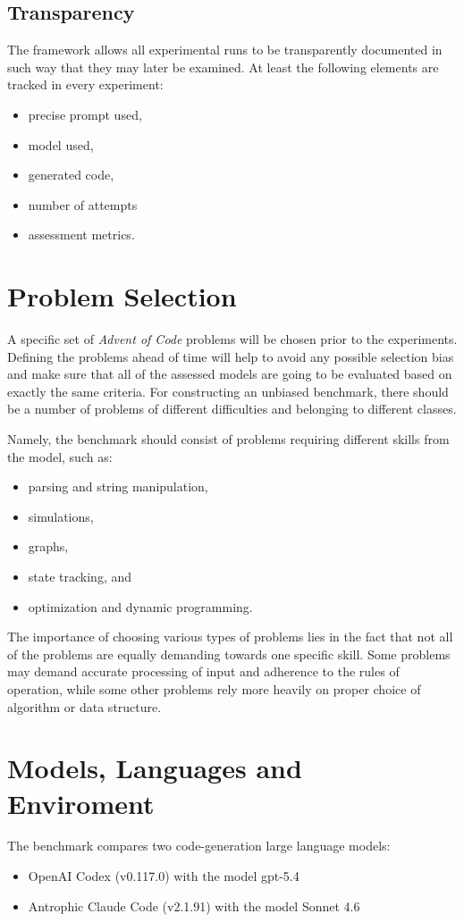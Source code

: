 \documentclass[12pt,a4paper]{report}
\begin{document}
\subsection{Transparency}
The framework allows all experimental runs to be transparently documented in such way that they may later be examined. At least the following elements are tracked in every experiment:
\begin{itemize}
    \item precise prompt used,
    \item model used,
    \item generated code,
    \item number of attempts
    \item assessment metrics.
\end{itemize}



\section{Problem Selection}
A specific set of \textit{Advent of Code} problems will be chosen prior to the experiments. Defining the problems ahead of time will help to avoid any possible selection bias and make sure that all of the assessed models are going to be evaluated based on exactly the same criteria. For constructing an unbiased benchmark, there should be a number of problems of different difficulties and belonging to different classes.

Namely, the benchmark should consist of problems requiring different skills from the model, such as:
\begin{itemize}
    \item parsing and string manipulation,
    \item simulations,
    \item graphs,
    \item state tracking, and
    \item optimization and dynamic programming.
\end{itemize}

The importance of choosing various types of problems lies in the fact that not all of the problems are equally demanding towards one specific skill. Some problems may demand accurate processing of input and adherence to the rules of operation, while some other problems rely more heavily on proper choice of algorithm or data structure.


\section{Models, Languages and Enviroment}
The benchmark compares two code-generation large language models:
\begin{itemize}
    \item OpenAI Codex (v0.117.0) with the model gpt-5.4
    \item Antrophic Claude Code (v2.1.91) with the model Sonnet 4.6
\end{itemize}
\end{document}
